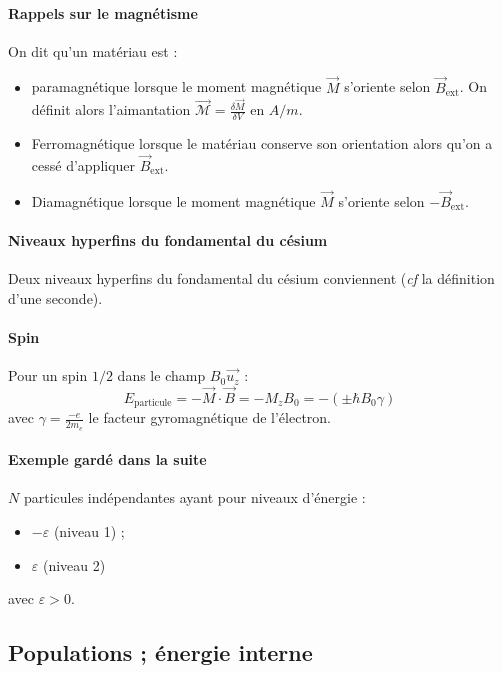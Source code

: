 \documentclass[french]{book}
\theoremstyle{plain}
\theoremstyle{definition}
\theoremstyle{remark}
\begin{document}
\paragraph{Rappels sur le magnétisme} On dit qu'un matériau est : 
\begin{itemize}
	\item paramagnétique lorsque le moment magnétique $\overrightarrow{M}$ s'oriente selon $\overrightarrow{B}_{\text{ext}}$. On définit alors l'aimantation $\displaystyle\overrightarrow{\mathcal{M}}=\frac{\delta\overrightarrow{M}}{\delta V}$ en $A/m$.
	\item Ferromagnétique lorsque le matériau conserve son orientation alors qu'on a cessé d'appliquer $\overrightarrow{B}_{\text{ext}}$.
	\item Diamagnétique lorsque le moment magnétique $\overrightarrow{M}$ s'oriente selon $-\overrightarrow{B}_{\text{ext}}$.
\end{itemize}

\paragraph{Niveaux hyperfins du fondamental du césium} Deux niveaux hyperfins du fondamental du césium conviennent (\textit{cf} la définition d'une seconde).

\paragraph{Spin} Pour un spin $1/2$ dans le champ $B_0\overrightarrow{u_z}$ : $$E_\text{particule}=-\overrightarrow{M}\cdot\overrightarrow{B}=-M_zB_0=-(\pm\hbar B_0\gamma)$$ avec $\gamma=\displaystyle\frac{-e}{2m_e}$ le facteur gyromagnétique de l'électron.

\paragraph{Exemple gardé dans la suite} $N$ particules indépendantes ayant pour niveaux d'énergie :
\begin{itemize}
	\item $-\varepsilon$ (niveau 1) ;
	\item $\varepsilon$ (niveau 2)
\end{itemize} avec $\varepsilon>0$.

\subsection{Populations ; énergie interne}
\end{document}
